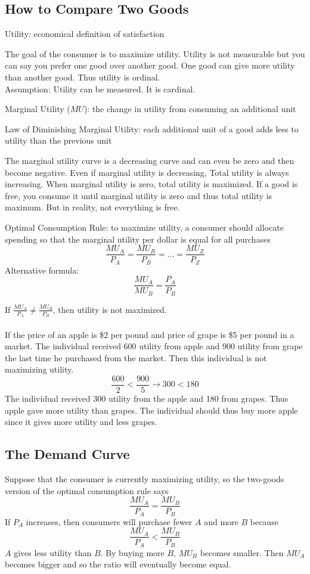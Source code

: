 \documentclass[12pt]{article}
\begin{document}
\subsection{How to Compare Two Goods}
\begin{definition} Utility: economical definition of satisfaction \end{definition} 
The goal of the consumer is to maximize utility. Utility is not measurable but you can say you prefer one good over another good. One good can give more utility than another good. Thus utility is ordinal. \\
Assumption: Utility can be measured. It is cardinal. 
\begin{definition} Marginal Utility ($MU$): the change in utility from consuming an additional unit \end{definition} 
\begin{definition} Law of Diminishing Marginal Utility: each additional unit of a good adds less to utility than the previous unit \end{definition} 
The marginal utility curve is a decreasing curve and can even be zero and then become negative. 
Even if marginal utility is decreasing, Total utility is always increasing. When marginal utility is zero, total utility is maximized. If a good is free, you consume it until marginal utility is zero and thus total utility is maximum. But in reality, not everything is free. 
\begin{definition} Optimal Consumption Rule: to maximize utility, a consumer should allocate spending so that the marginal utility per dollar is equal for all purchases $$\frac{MU_A}{P_A} = \frac{MU_B}{P_B} = \dots = \frac{MU_Z}{P_Z} $$ Alternative formula: $$\frac{MU_A}{MU_B} = \frac{P_A}{P_B} $$ \end{definition} 
If $\frac{MU_A}{P_A} \neq \frac{MU_B}{P_B}$, then utility is not maximized. \\~\\
If the price of an apple is \$2 per pound and price of grape is \$5 per pound in a market. The individual received 600 utility from apple and 900 utility from grape the last time he purchased from the market. Then this individual is not maximizing utility. $$\frac{600}{2} < \frac{900}{5}  \to 300 < 180 $$ The individual received 300 utility from the apple and 180 from grapes. Thus apple gave more utility than grapes. The individual should thus buy more apple since it gives more utility and less grapes. 

\subsection{The Demand Curve}
Suppose that the consumer is currently maximizing utility, so the two-goods version of the optimal consumption rule says $$\frac{MU_A}{P_A} = \frac{MU_B}{P_B} $$ If $P_A$ increases, then consumers will purchase fewer $A$ and more $B$ because $$\frac{MU_A}{P_A} < \frac{MU_B}{P_B} $$ $A$ gives less utility than $B$. By buying more $B$, $MU_B$ becomes smaller. Then $MU_A$ becomes bigger and so the ratio will eventually become equal. 
\end{document}
